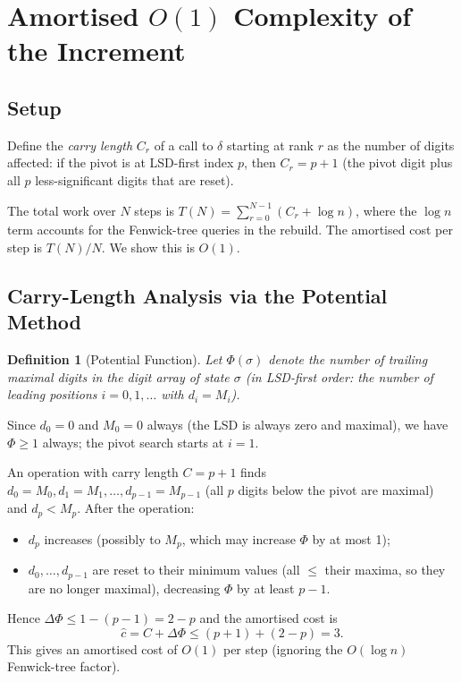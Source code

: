 \documentclass[11pt,a4paper]{article}
\newtheorem{definition}{Definition}[section]
\begin{document}
    \section{Amortised $O(1)$ Complexity of the Increment}
    \label{sec:amortised}

    \subsection{Setup}

    Define the \emph{carry length} $C_r$ of a call to $\delta$ starting at
    rank $r$ as the number of digits affected: if the pivot is at LSD-first
    index $p$, then $C_r = p+1$ (the pivot digit plus all $p$ less-significant
    digits that are reset).

    The total work over $N$ steps is $T(N) = \sum_{r=0}^{N-1} (C_r + \log n)$,
    where the $\log n$ term accounts for the Fenwick-tree queries in the rebuild.
    The amortised cost per step is $T(N)/N$. We show this is $O(1)$.

    \subsection{Carry-Length Analysis via the Potential Method}

    \begin{definition}[Potential Function]
        \label{def:potential}
        Let $\Phi(\sigma)$ denote the number of \emph{trailing maximal digits} in
        the digit array of state $\sigma$ (in LSD-first order: the number of
        leading positions $i = 0,1,\dots$ with $d_i = M_i$).
    \end{definition}

    Since $d_0 = 0$ and $M_0 = 0$ always (the LSD is always zero and maximal),
    we have $\Phi \geq 1$ always; the pivot search starts at $i = 1$.

    An operation with carry length $C = p+1$ finds $d_0 = M_0, d_1 = M_1, \dots,
    d_{p-1} = M_{p-1}$ (all $p$ digits below the pivot are maximal) and
    $d_p < M_p$. After the operation:
    \begin{itemize}
        \item $d_p$ increases (possibly to $M_p$, which may increase $\Phi$ by
        at most 1);
        \item $d_0, \dots, d_{p-1}$ are reset to their minimum values (all $\leq$
        their maxima, so they are no longer maximal), decreasing $\Phi$
        by at least $p-1$.
    \end{itemize}
    Hence $\Delta\Phi \leq 1 - (p-1) = 2-p$ and the amortised cost is
    \[
        \hat{c} = C + \Delta\Phi \leq (p+1) + (2-p) = 3.
    \]
    This gives an amortised cost of $O(1)$ per step (ignoring the $O(\log n)$
    Fenwick-tree factor).
\end{document}
